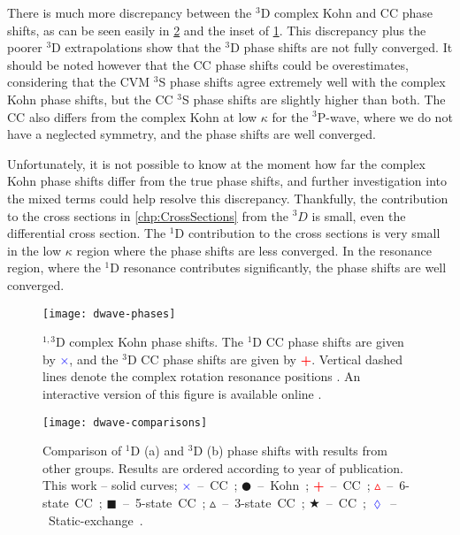 \documentclass[Dissertation.tex]{subfiles}
\begin{document}
There is much more discrepancy between the $^3$D complex Kohn and CC phase
shifts, as can be seen easily in \cref{fig:DWaveComparisons} and the inset of
\cref{fig:DWavePhase}. This discrepancy
plus the poorer $^3$D extrapolations show that the $^3$D phase shifts are not
fully converged. It should be noted however that the CC phase shifts could be
overestimates, considering that the CVM \cite{Zhang2012} $^3$S phase shifts
agree extremely well with the complex Kohn phase shifts, but the CC $^3$S phase shifts are
slightly higher than both. The CC also differs from the complex
Kohn at low $\kappa$ for the $^3$P-wave, where we do not have a neglected
symmetry, and the phase shifts are well converged.

Unfortunately, it is not possible to know at the moment how far the complex 
Kohn phase shifts differ from the true phase shifts, and further 
investigation into the mixed terms could help resolve this discrepancy.
Thankfully, the contribution to the cross sections
in \cref{chp:CrossSections} from the $^3D$ is small, even the differential
cross section. The $^1$D contribution to the cross sections is very small
in the low $\kappa$ region where the phase shifts are less converged. In the
resonance region, where the $^1$D resonance contributes significantly, the
phase shifts are well converged.


\begin{figure}
	\centering
	\texttt{[image: dwave-phases]}
	\caption[$^{1,3}$D phase shifts]{$^{1,3}$D complex Kohn phase shifts. The $^1$D CC phase shifts
\cite{Walters2004} are given by \mbox{\textcolor{blue}{$\times$}}, and the
$^3$D CC phase shifts \cite{Blackwood2002} are given by
\mbox{\textcolor{red}{\textbf{+}}}. Vertical dashed lines denote the complex rotation resonance
positions \cite{Ho1998}. An interactive version of this figure is available online \cite{Plotly}.}
	\label{fig:DWavePhase}
\end{figure}

\begin{figure}
	\centering
	\texttt{[image: dwave-comparisons]}
	\caption[Comparison of D-wave phase shifts]{Comparison of $^1$D (a) and $^3$D (b) phase shifts with results from other groups. Results are ordered according to year of publication. This work -- solid curves; \mbox{\textcolor{blue}{$\times$} -- CC \cite{Walters2004};} \mbox{$\CIRCLE$ -- Kohn \cite{VanReeth2003};} \mbox{\textcolor{red}{\textbf{+}} -- CC \cite{Blackwood2002};} \mbox{\textcolor{red}{$\vartriangle$} -- 6-state CC \cite{Sinha2000};} \mbox{$\blacksquare$ -- 5-state CC \cite{Adhikari1999};} \mbox{$\vartriangle$ -- 3-state CC \cite{Sinha1997};} \mbox{\textcolor[RGB]{0,127,0}{$\bigstar$} -- CC \cite{Ray1997};} \mbox{\textcolor{blue}{$\lozenge$} -- Static-exchange \cite{Hara1975}.}}
	\label{fig:DWaveComparisons}
\end{figure}
\end{document}
